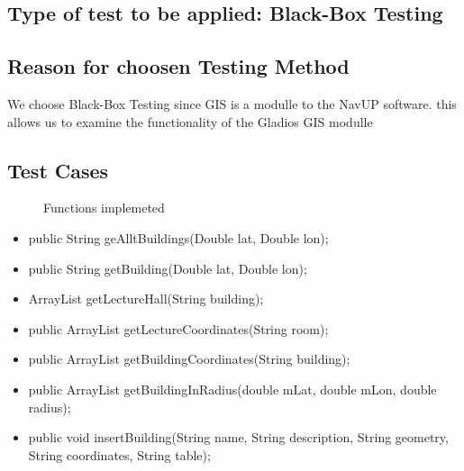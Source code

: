 \documentclass[12pt]{article}
\begin{document}
	\subsection{Type of test to be applied: Black-Box Testing}
		\subsection{Reason for choosen Testing Method }
		We choose Black-Box Testing since GIS is a modulle to the NavUP software. this allows us to examine the functionality of 
		the Gladios GIS modulle


	\subsection{Test Cases}
		\begin{description}
			\item[] Functions implemeted
		\end{description}
	\begin{itemize}
		
		\item{public String geAlltBuildings(Double lat, Double lon);}
		
		
		\item{public String getBuilding(Double lat, Double lon);}
		
		
		\item{ArrayList getLectureHall(String building);}
		
		
		\item{public ArrayList getLectureCoordinates(String room);}
		
		
		\item	{public ArrayList getBuildingCoordinates(String building);   }        
		
		\item{public ArrayList getBuildingInRadius(double mLat, double mLon, double radius);}    
		
		\item {public void insertBuilding(String name, String description, String geometry, String coordinates, String table);}
	\end{itemize}
		
\end{document}

